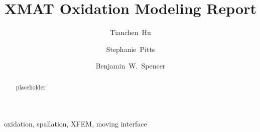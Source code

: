 \begin{frontmatter}
  \title{XMAT Oxidation Modeling Report}

  \author[1]{Tianchen~Hu}
  \author[1]{Stephanie~Pitts}
  \author[1]{Benjamin~W.~Spencer}

  \address[1]{Idaho National Laboratory, Idaho Falls, Idaho}

  \begin{abstract}

    placeholder

  \end{abstract}

  \begin{keyword}
    oxidation, spallation, XFEM, moving interface
  \end{keyword}
\end{frontmatter}
